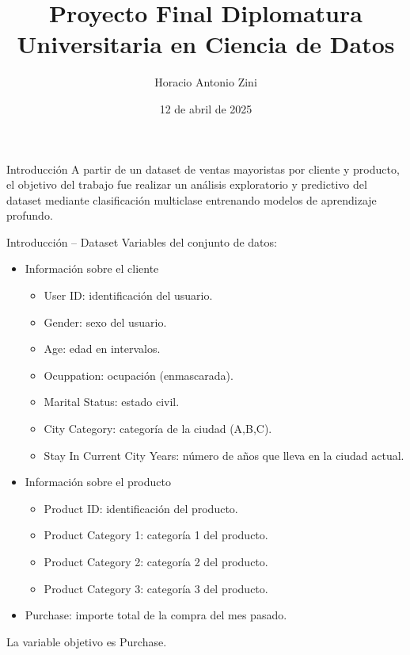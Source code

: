 \documentclass{beamer}
\title{Proyecto Final Diplomatura Universitaria en Ciencia de Datos}
\author{Horacio Antonio Zini}
\date{12 de abril de 2025}
\begin{document}
    \frame{\titlepage}
    \begin{frame}{Introducción}
        A partir de un dataset de ventas mayoristas por cliente y producto, el objetivo del trabajo 
        fue realizar un análisis exploratorio y predictivo del dataset mediante clasificación multiclase 
        entrenando modelos de aprendizaje profundo.
    \end{frame}
    \begin{frame}{Introducci\'on -- Dataset}
        Variables del conjunto de datos: 
        \begin{itemize}
            \item Información sobre el cliente
            \begin{itemize}
                \item User ID: identificación del usuario.
                \item Gender: sexo del usuario.
                \item Age: edad en intervalos.
                \item Ocuppation: ocupación (enmascarada).
                \item Marital Status: estado civil.
                \item City Category: categoría de la ciudad (A,B,C).
                \item Stay In Current City Years: número de años que lleva en la ciudad actual.
            \end{itemize}
            \item Información sobre el producto
                \begin{itemize}
                    \item Product ID: identificación del producto.
                    \item Product Category 1: categoría 1 del producto.
                    \item Product Category 2: categoría 2 del producto.
                    \item Product Category 3: categoría 3 del producto.
                \end{itemize}
            \item Purchase: importe total de la compra del mes pasado.
        \end{itemize}
        La variable objetivo es Purchase.
    \end{frame}
\end{document}
